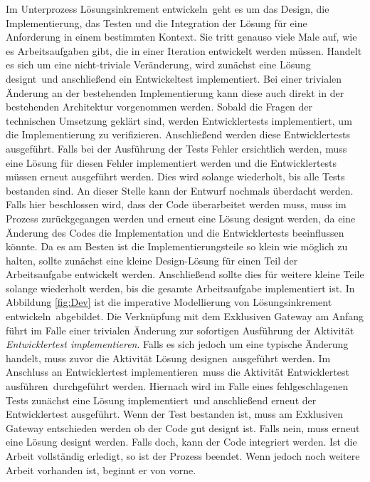Im Unterprozess \grqq Lösungsinkrement entwickeln\grqq \ geht es um das Design, die Implementierung, das Testen und die Integration der Lösung für eine Anforderung in einem bestimmten Kontext. Sie tritt genauso viele Male auf, wie es Arbeitsaufgaben gibt, die in einer Iteration entwickelt werden müssen.
 Handelt es sich um eine nicht-triviale Veränderung, wird zunächst eine \grqq Lösung designt\grqq \ und anschließend ein \grqq Entwickeltest implementiert\grqq. Bei einer trivialen Änderung an der bestehenden Implementierung kann diese auch direkt in der bestehenden Architektur vorgenommen werden. \newline
 Sobald die Fragen der technischen Umsetzung geklärt sind, werden \grqq Entwicklertests implementiert\grqq, um die Implementierung zu verifizieren. Anschließend werden diese \grqq Entwicklertests ausgeführt\grqq.\newline
 Falls bei der Ausführung der Tests Fehler ersichtlich werden, muss eine Lösung für diesen Fehler implementiert werden und die Entwicklertests müssen erneut ausgeführt werden. Dies wird solange wiederholt, bis alle Tests bestanden sind.\newline
An dieser Stelle kann der Entwurf nochmals überdacht werden. Falls hier beschlossen wird, dass der Code überarbeitet werden muss, muss im Prozess zurückgegangen werden und erneut eine Lösung designt werden, da eine Änderung des Codes die Implementation und die Entwicklertests beeinflussen könnte.\newline
 Da es am Besten ist die Implementierungsteile so klein wie möglich zu halten, sollte zunächst eine kleine Design-Lösung für einen Teil der Arbeitsaufgabe entwickelt werden. Anschließend sollte dies für weitere kleine Teile solange wiederholt werden, bis die gesamte Arbeitsaufgabe implementiert ist. \newline
 In Abbildung \ref{fig:Dev} ist die imperative Modellierung von \grqq Lösungsinkrement entwickeln\grqq \ abgebildet.\newline
 Die Verknüpfung mit dem Exklusiven Gateway am Anfang führt im Falle einer trivialen Änderung zur sofortigen Ausführung der Aktivität \textit{Entwicklertest implementieren}. Falls es sich jedoch um eine typische Änderung handelt, muss zuvor die Aktivität \grqq Lösung designen\grqq \ ausgeführt werden. Im Anschluss an \grqq Entwicklertest implementieren\grqq \ muss die Aktivität \grqq Entwicklertest ausführen\grqq \ durchgeführt werden.\newline
 Hiernach wird im Falle eines fehlgeschlagenen Tests zunächst eine \grqq Lösung implementiert\grqq \ und anschließend erneut der \grqq Entwicklertest ausgeführt\grqq. \newline
 Wenn der Test bestanden ist, muss am Exklusiven Gateway entschieden werden ob der Code gut designt ist. Falls nein, muss erneut eine Lösung designt werden. Falls doch, kann der Code integriert werden. Ist die Arbeit vollständig erledigt, so ist der Prozess beendet. Wenn jedoch noch weitere Arbeit vorhanden ist, beginnt er von vorne.
 
